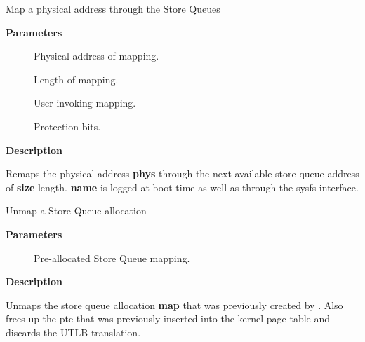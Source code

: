 \documentclass[a4paper,8pt,english]{sphinxmanual}
\begin{document}
\begin{fulllineitems}
\label{sh/index:c.sq_remap}
Map a physical address through the Store Queues

\end{fulllineitems}


\textbf{Parameters}
\begin{description}
\item[{}] \leavevmode
Physical address of mapping.

\item[{}] \leavevmode
Length of mapping.

\item[{}] \leavevmode
User invoking mapping.

\item[{}] \leavevmode
Protection bits.

\end{description}

\textbf{Description}

Remaps the physical address \textbf{phys} through the next available store queue
address of \textbf{size} length. \textbf{name} is logged at boot time as well as through
the sysfs interface.

\begin{fulllineitems}
\label{sh/index:c.sq_unmap}
Unmap a Store Queue allocation

\end{fulllineitems}


\textbf{Parameters}
\begin{description}
\item[{}] \leavevmode
Pre-allocated Store Queue mapping.

\end{description}

\textbf{Description}

Unmaps the store queue allocation \textbf{map} that was previously created by
{\hyperref[sh/index:c.sq_remap]{\emph{}}}. Also frees up the pte that was previously inserted into
the kernel page table and discards the UTLB translation.
\end{document}

